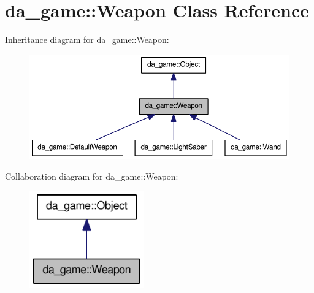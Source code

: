 \hypertarget{classda__game_1_1Weapon}{
\section{da\_\-game::Weapon Class Reference}
\label{classda__game_1_1Weapon}
}
Inheritance diagram for da\_\-game::Weapon:\nopagebreak
\begin{figure}[H]
\begin{center}
\leavevmode
\includegraphics[width=400pt]{classda__game_1_1Weapon__inherit__graph}
\end{center}
\end{figure}
Collaboration diagram for da\_\-game::Weapon:\nopagebreak
\begin{figure}[H]
\begin{center}
\leavevmode
\includegraphics[width=140pt]{classda__game_1_1Weapon__coll__graph}
\end{center}
\end{figure}
